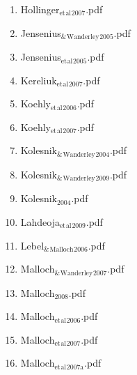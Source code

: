 \documentclass[11pt]{article}
\begin{document}
\begin{enumerate}
\begin{enumerate}
\begin{enumerate}
\item Hollinger$_{\text{et}}$$_{\text{al}}$$_{\text{2007}}$.pdf
\label{sec-1-1-1-1-15-7-2-19}

\item Jensenius$_{\text{\&}}$$_{\text{Wanderley}}$$_{\text{2005}}$.pdf
\label{sec-1-1-1-1-15-7-2-20}

\item Jensenius$_{\text{et}}$$_{\text{al}}$$_{\text{2005}}$.pdf
\label{sec-1-1-1-1-15-7-2-21}

\item Kereliuk$_{\text{et}}$$_{\text{al}}$$_{\text{2007}}$.pdf
\label{sec-1-1-1-1-15-7-2-22}

\item Koehly$_{\text{et}}$$_{\text{al}}$$_{\text{2006}}$.pdf
\label{sec-1-1-1-1-15-7-2-23}

\item Koehly$_{\text{et}}$$_{\text{al}}$$_{\text{2007}}$.pdf
\label{sec-1-1-1-1-15-7-2-24}

\item Kolesnik$_{\text{\&}}$$_{\text{Wanderley}}$$_{\text{2004}}$.pdf
\label{sec-1-1-1-1-15-7-2-25}

\item Kolesnik$_{\text{\&}}$$_{\text{Wanderley}}$$_{\text{2009}}$.pdf
\label{sec-1-1-1-1-15-7-2-26}

\item Kolesnik$_{\text{2004}}$.pdf
\label{sec-1-1-1-1-15-7-2-27}

\item Lahdeoja$_{\text{et}}$$_{\text{al}}$$_{\text{2009}}$.pdf
\label{sec-1-1-1-1-15-7-2-28}

\item Lebel$_{\text{\&}}$$_{\text{Malloch}}$$_{\text{2006}}$.pdf
\label{sec-1-1-1-1-15-7-2-29}

\item Malloch$_{\text{\&}}$$_{\text{Wanderley}}$$_{\text{2007}}$.pdf
\label{sec-1-1-1-1-15-7-2-30}

\item Malloch$_{\text{2008}}$.pdf
\label{sec-1-1-1-1-15-7-2-31}

\item Malloch$_{\text{et}}$$_{\text{al}}$$_{\text{2006}}$.pdf
\label{sec-1-1-1-1-15-7-2-32}

\item Malloch$_{\text{et}}$$_{\text{al}}$$_{\text{2007}}$.pdf
\label{sec-1-1-1-1-15-7-2-33}

\item Malloch$_{\text{et}}$$_{\text{al}}$$_{\text{2007a}}$.pdf
\label{sec-1-1-1-1-15-7-2-34}


\end{enumerate}
\end{enumerate}
\end{enumerate}
\end{document}
